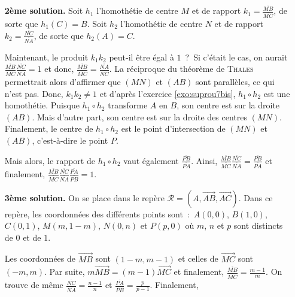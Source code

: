 {{\begin{itemize}
$$\frac{\overline{NC}}{\overline{NA}}=\frac{\overline{MC}}{\overline{MA_1}}\;\mbox{et}\;
\frac{\overline{PA}}{\overline{PB}}=\frac{\overline{MA_1}}{\overline{MB}},$$

et donc,

$$\frac{\overline{MB}}{\overline{MC}}.\frac{\overline{NC}}{\overline{NA}}.\frac{\overline{PA}}
{\overline{PB}}=\frac{\overline{MB}}{\overline{MC}}.\frac{\overline{MC}}{\overline{MA_1}}.\frac{\overline{MA_1}}
{\overline{MB}}=1.$$

\item[\textbf{2ème solution.}] Soit $h_1$ l'homothétie de centre $M$ et de rapport $k_1=\frac{\overline{MB}}{\overline{MC}}$, de sorte que $h_1(C)=B$. Soit $h_2$ l'homothétie de centre $N$ et de rapport $k_2=\frac{\overline{NC}}{\overline{NA}}$, de sorte que $h_2(A)=C$.

Maintenant, le produit $k_1k_2$ peut-il être égal à $1$~?~Si c'était le cas, on aurait $\frac{\overline{MB}}{\overline{MC}}\frac{\overline{NC}}{\overline{NA}}=1$ et donc, $\frac{\overline{MB}}{\overline{MC}}=\frac{\overline{NA}}{\overline{NC}}$. La réciproque du théorème de \textsc{Thales} permettrait alors d'affirmer que $(MN)$ et $(AB)$ sont parallèles, ce qui n'est pas. Donc, $k_1k_2\neq1$ et d'après l'exercice \ref{exo:suprou7bis}, $h_1\circ h_2$ est une homothétie. Puisque $h_1\circ h_2$ transforme $A$ en $B$, son centre est sur la droite $(AB)$. Mais d'autre part, son centre est sur la droite des centres $(MN)$. Finalement, le centre de $h_1\circ h_2$ est le point d'intersection de $(MN)$ et $(AB)$, c'est-à-dire le point $P$.

Mais alors, le rapport de $h_1\circ h_2$ vaut également $\frac{\overline{PB}}{\overline{PA}}$. Ainsi, 
$\frac{\overline{MB}}{\overline{MC}}\frac{\overline{NC}}{\overline{NA}}=\frac{\overline{PB}}{\overline{PA}}$ et finalement, $\frac{\overline{MB}}{\overline{MC}}\frac{\overline{NC}}{\overline{NA}}\frac{\overline{PA}}{\overline{PB}}=1$.

\item[\textbf{3ème solution.}] On se place dans le repère $\mathcal{R}=(A,\overrightarrow{AB},\overrightarrow{AC})$. Dans ce repère, les coordonnées des différents points sont~:~$A(0,0)$, $B(1,0)$, $C(0,1)$, $M(m,1-m)$, $N(0,n)$ et $P(p,0)$ où $m$, $n$ et $p$ sont distincts de $0$ et de $1$.

Les coordonnées de $\overrightarrow{MB}$ sont $(1-m,m-1)$ et celles de $\overrightarrow{MC}$ sont $(-m,m)$. Par suite, $m\overrightarrow{MB}=(m-1)\overrightarrow{MC}$ et finalement, $\frac{\overline{MB}}{\overline{MC}}=\frac{m-1}{m}$. On trouve de même $\frac{\overline{NC}}{\overline{NA}}=\frac{n-1}{n}$ et $\frac{\overline{PA}}{\overline{PB}}=\frac{p}{p-1}$. Finalement,


\end{itemize}}}
